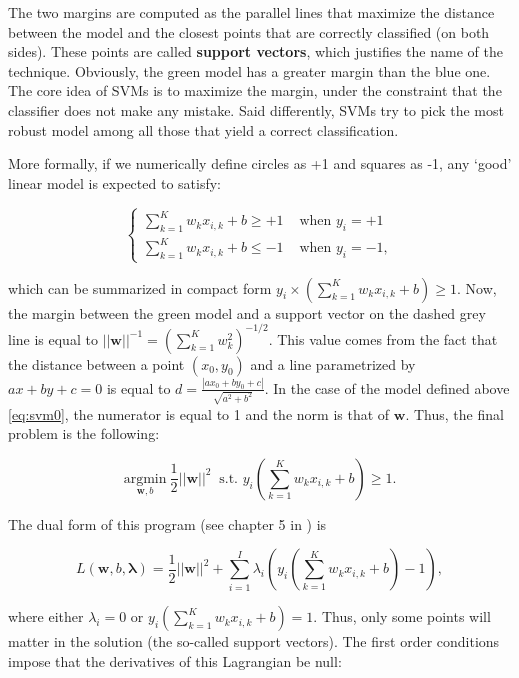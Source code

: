 The two margins are computed as the parallel lines that maximize the distance between the model and the closest points that are correctly classified (on both sides). These points are called \textbf{support vectors}, which justifies the name of the technique. Obviously, the green model has a greater margin than the blue one. The core idea of SVMs is to maximize the margin, under the constraint that the classifier does not make any mistake. Said differently, SVMs try to pick the most robust model among all those that yield a correct classification.

More formally, if we numerically define circles as +1 and squares as -1, any `good' linear model is expected to satisfy:

\begin{equation}
\label{eq:svm0}
\left\{\begin{array}{lll}
\sum_{k=1}^Kw_kx_{i,k}+b \ge +1 & \text{ when } y_i=+1 \\
\sum_{k=1}^Kw_kx_{i,k}+b \le -1 & \text{ when } y_i=-1,
\end{array}\right.
\end{equation}

which can be summarized in compact form $y_i \times \left(\sum_{k=1}^K w_kx_{i,k}+b \right)\ge 1$. Now, the margin between the green model and a support vector on the dashed grey line is equal to $||\textbf{w}||^{ -1}=\left(\sum_{k=1}^Kw_k^2\right)^{ -1/2}$. This value comes from the fact that the distance between a point $(x_0,y_0)$ and a line parametrized by $ax+by+c=0$ is equal to $d=\frac{|ax_0+by_0+c|}{\sqrt{a^2+b^2}}$. In the case of the model defined above \ref{eq:svm0}, the numerator is equal to 1 and the norm is that of $\textbf{w}$. Thus, the final problem is the following:

\begin{equation}
\label{eq:svm1}
\underset{\textbf{w}, b}{\text{argmin}} \ \frac{1}{2} ||\textbf{w}||^2 \ \text{ s.t. } y_i\left(\sum_{k=1}^Kw_kx_{i,k}+b \right)\ge 1.
\end{equation}

The dual form of this program (see chapter 5 in \cite{boyd2004convex}) is

\begin{equation}
\label{eq:svm1b}
L(\textbf{w},b,\boldsymbol{\lambda})=
 \frac{1}{2}||\textbf{w}||^2 + \sum_{i=1}^I\lambda_i\left(y_i\left(\sum_{k=1}^Kw_kx_{i,k}+b \right)- 1\right),
\end{equation}

where either $\lambda_i=0$ or $y_i\left(\sum_{k=1}^Kw_kx_{i,k}+b \right)= 1$. Thus, only some points will matter in the solution (the so-called support vectors). The first order conditions impose that the derivatives of this Lagrangian be null:

